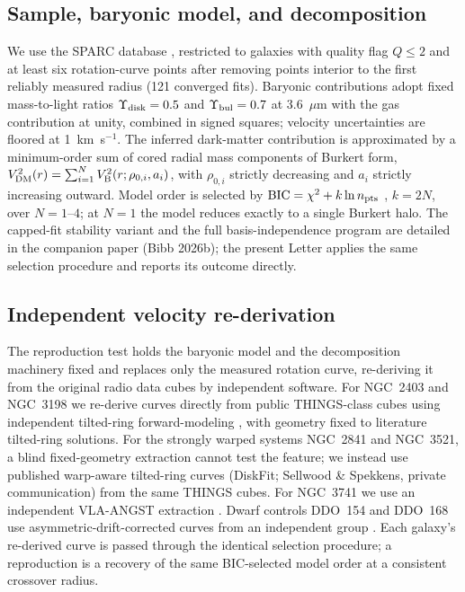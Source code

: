 \documentclass[twocolumn]{aastex701}
\begin{document}
\subsection{Sample, baryonic model, and decomposition}
We use the SPARC database \citep{Lelli2016}, restricted to galaxies with quality
flag $Q \le 2$ and at least six rotation-curve points after removing points
interior to the first reliably measured radius (121 converged fits). Baryonic
contributions adopt fixed mass-to-light ratios $\Upsilon_{\rm disk} = 0.5$ and
$\Upsilon_{\rm bul} = 0.7$ at 3.6~$\mu$m with the gas contribution at unity,
combined in signed squares; velocity uncertainties are floored at 1~km~s$^{-1}$.
The inferred dark-matter contribution is approximated by a minimum-order sum of
cored radial mass components of Burkert form, $V^2_{\rm DM}(r) = \sum_{i=1}^{N}
V^2_{\rm B}(r;\rho_{0,i},a_i)$, with $\rho_{0,i}$ strictly decreasing and $a_i$
strictly increasing outward. Model order is selected by ${\rm BIC} = \chi^2 + k
\ln n_{\rm pts}$ \citep{Schwarz1978,Liddle2007}, $k = 2N$, over $N = 1$--$4$; at
$N = 1$ the model reduces exactly to a single Burkert halo. The capped-fit stability
variant and the full basis-independence program are detailed in the companion paper
(Bibb 2026b); the present Letter applies the same selection procedure and reports its
outcome directly.

\subsection{Independent velocity re-derivation}
The reproduction test holds the baryonic model and the decomposition machinery
fixed and replaces only the measured rotation curve, re-deriving it from the
original radio data cubes by independent software. For NGC~2403 and NGC~3198 we
re-derive curves directly from public THINGS-class cubes using independent
tilted-ring forward-modeling \citep[$^{3\rm D}$Barolo;][]{DiTeodoro2015}, with
geometry fixed to literature tilted-ring solutions. For the strongly warped
systems NGC~2841 and NGC~3521, a blind fixed-geometry extraction cannot test the
feature; we instead use published warp-aware tilted-ring curves (DiskFit;
Sellwood \& Spekkens, private communication) from the same THINGS cubes. For
NGC~3741 we use an independent VLA-ANGST extraction \citep[a different telescope
from the WSRT-based SPARC curve;][]{Walter2008}. Dwarf controls DDO~154 and
DDO~168 use asymmetric-drift-corrected curves from an independent group
\citep[3D forward-modeling;][]{Iorio2017}. Each galaxy's re-derived curve is
passed through the identical selection procedure; a reproduction is a recovery of
the same BIC-selected model order at a consistent crossover radius.
\end{document}
